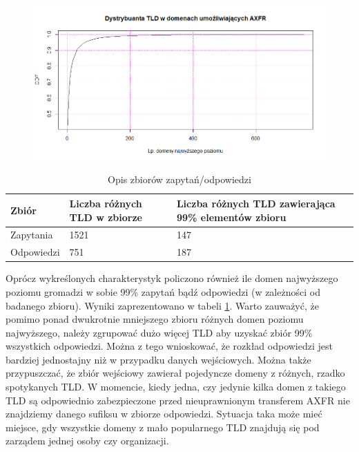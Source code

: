 \begin{figure}[ht]
	\centering
	\includegraphics[width=1.0\textwidth]{image/cdf_tld_resp}
	\caption{}
	\label{cdf_tld_resp}
\end{figure}

\begin{table}[]
	\centering
	\caption{Opis zbiorów zapytań/odpowiedzi}
	\label{cdf_table}
	\begin{tabular}{|p{}|p{}|p{}|}
		\hline
		\textbf{Zbiór} & 
		\textbf{Liczba różnych TLD w zbiorze} & 
		\textbf{Liczba różnych TLD zawierająca 99\% elementów zbioru} \\
		\hline\hline
		Zapytania & 
		1521 & 
		147\\
		\hline
		Odpowiedzi & 
		751 & 
		187\\
		\hline\hline		
	\end{tabular}
\end{table}

Oprócz wykreślonych charakterystyk policzono również ile domen najwyższego poziomu gromadzi w sobie 99\% zapytań bądź odpowiedzi (w zależności od badanego zbioru). Wyniki zaprezentowano w tabeli \ref{cdf_table}. Warto zauważyć, że pomimo ponad dwukrotnie mniejszego zbioru różnych domen poziomu najwyższego, należy zgrupować dużo więcej TLD aby uzyskać zbiór 99\% wszystkich odpowiedzi. Można z tego wnioskować, że rozkład odpowiedzi jest bardziej jednostajny niż w przypadku danych wejściowych. Można także przypuszczać, że zbiór wejściowy zawierał pojedyncze domeny z różnych, rzadko spotykanych TLD. W momencie, kiedy jedna, czy jedynie kilka domen z takiego TLD są odpowiednio zabezpieczone przed nieuprawnionym transferem AXFR nie znajdziemy danego sufiksu w zbiorze odpowiedzi. Sytuacja taka może mieć miejsce, gdy wszystkie domeny z mało popularnego TLD znajdują się pod zarządem jednej osoby czy organizacji.


